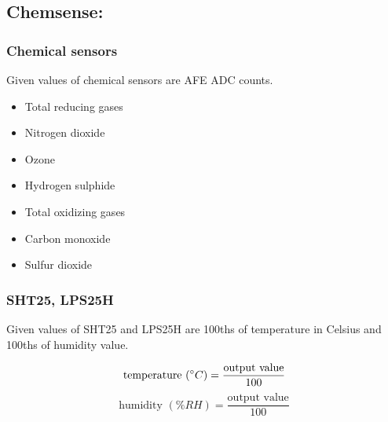 % 


\bigbreak
\subsection{Chemsense:}
\subsubsection{ Chemical sensors}

Given values of chemical sensors are AFE ADC counts.

\begin{itemize}
  \item Total reducing gases
  \item Nitrogen dioxide
  \item Ozone
  \item Hydrogen sulphide
  \item Total oxidizing gases
  \item Carbon monoxide
  \item Sulfur dioxide
\end{itemize}


\subsubsection{ SHT25, LPS25H}

Given values of SHT25 and LPS25H are 100ths of temperature in Celsius and 100ths of humidity value.

{\centering
 \[ \text{temperature }(\degree C) = \frac{\text{output value}}{100} \]
 \[ \text{humidity }(\% RH) = \frac{\text{output value}}{100} \]
 \par
 }

% 
% 

